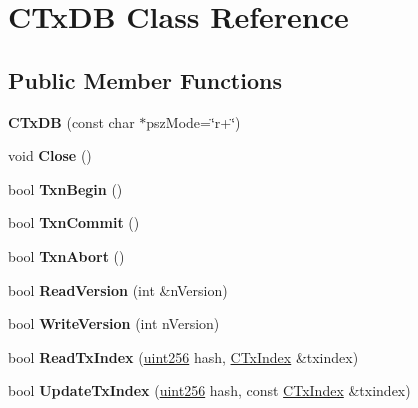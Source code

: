 \hypertarget{class_c_tx_d_b}{}\section{C\+Tx\+DB Class Reference}
\label{class_c_tx_d_b}
\subsection*{Public Member Functions}
\begin{DoxyCompactItemize}
\item 
\mbox{\label{class_c_tx_d_b_a15efd656b7f86b0abf8d99183cae493a}} 
{\bfseries C\+Tx\+DB} (const char $\ast$psz\+Mode=\char`\"{}r+\char`\"{})
\item 
\mbox{\label{class_c_tx_d_b_ad319e9c15a7a03b9b80d7affb7fb655e}} 
void {\bfseries Close} ()
\item 
\mbox{\label{class_c_tx_d_b_af3c27c5cb8f922b5c03840feda844016}} 
bool {\bfseries Txn\+Begin} ()
\item 
\mbox{\label{class_c_tx_d_b_aff04f078df2fc3640d559ce62fc9a6a2}} 
bool {\bfseries Txn\+Commit} ()
\item 
\mbox{\label{class_c_tx_d_b_ac984bce763c97af6fd90f3056367b521}} 
bool {\bfseries Txn\+Abort} ()
\item 
\mbox{\label{class_c_tx_d_b_a24938c7578577c08b2a3eae7617dfa1e}} 
bool {\bfseries Read\+Version} (int \&n\+Version)
\item 
\mbox{\label{class_c_tx_d_b_aa30dbf235b1c229896097e1eb1ea9520}} 
bool {\bfseries Write\+Version} (int n\+Version)
\item 
\mbox{\label{class_c_tx_d_b_a8a138e5dcc3ef98991abaa16eaa8ddeb}} 
bool {\bfseries Read\+Tx\+Index} (\mbox{\hyperlink{classuint256}{uint256}} hash, \mbox{\hyperlink{class_c_tx_index}{C\+Tx\+Index}} \&txindex)
\item 
\mbox{\label{class_c_tx_d_b_a62fb371022854dc8cb247bed36302df2}} 
bool {\bfseries Update\+Tx\+Index} (\mbox{\hyperlink{classuint256}{uint256}} hash, const \mbox{\hyperlink{class_c_tx_index}{C\+Tx\+Index}} \&txindex)

\end{DoxyCompactItemize}
